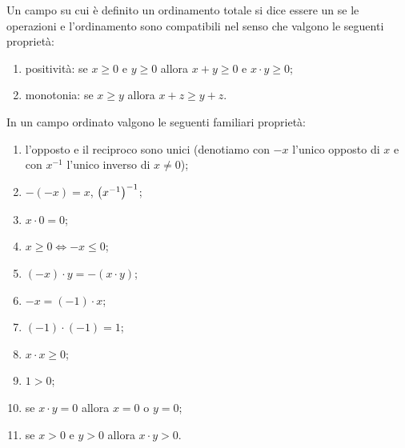 \begin{definition}
\label{def:campo_ordinato}%
Un campo su cui è definito un ordinamento totale
si dice essere un 
se le operazioni e l'ordinamento sono compatibili
nel senso che
valgono le seguenti proprietà:
\begin{enumerate}
\item positività: se $x\ge 0$ e $y \ge 0$ allora $x+y \ge 0$ e $x\cdot y\ge 0$;
\item monotonia: se $x \ge y$ allora $x+z \ge y+z$.
\end{enumerate}
\end{definition}

\begin{theorem}
In un campo ordinato
valgono le seguenti
familiari proprietà:
\begin{enumerate}
  \item l'opposto e il reciproco sono unici
  (denotiamo con $-x$ l'unico opposto di $x$ e con $x^{-1}$ l'unico inverso di $x\neq 0$);
  \item $-(-x) = x$, ${\left( x^{-1} \right)}^{-1}$;
  \item $x \cdot 0 = 0$;
  \item $x\ge 0 \iff -x \le 0$;
  \item $(-x)\cdot y = -(x\cdot y)$;
  \item $-x = (-1)\cdot x$;
  \item $(-1)\cdot(-1) = 1$;
  \item $x\cdot x \ge 0$;
  \item $1 > 0$;
  \item se $x\cdot y = 0$ allora $x = 0$ o $y = 0$;
  \item se $x>0$ e $y>0$  allora $x\cdot y > 0$.
\end{enumerate}
\end{theorem}
%
